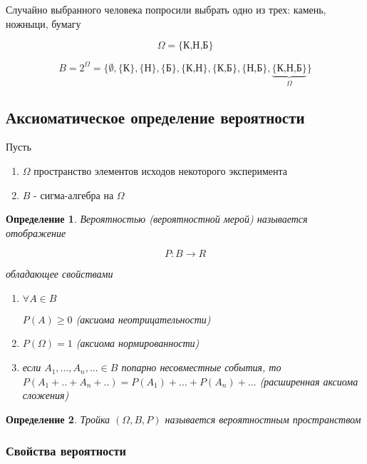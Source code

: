 \documentclass[a4paper, 14pt]{report}
\newtheorem{defenition}{Определение}[section]
\begin{document}
Случайно выбранного человека попросили выбрать одно из трех: камень, ножныци, бумагу

$$
\Omega = \{\text{К,Н,Б}\}
$$

$$
B = 2^\Omega = \{ \emptyset, \{\text{К}\}, \{\text{Н}\}, \{\text{Б}\}, \{\text{К,Н}\}, \{\text{К,Б}\}, \{\text{Н,Б}\}, \underbrace{\{\text{К,Н,Б}\}}_\Omega \}
$$

\subsection{Аксиоматическое определение вероятности}

Пусть

\begin{enumerate}
    \item $\Omega$ пространство элементов исходов некоторого эксперимента
    \item $B$ - сигма-алгебра на $\Omega$
\end{enumerate}

\begin{defenition}
    Вероятностью (вероятностной мерой) называется отображение

    $$
    P: B \to R
    $$

    обладающее свойствами

    \begin{enumerate}
        \item $\forall A \in B$
        
        $ P(A) \geq 0$ (аксиома неотрицательности)
        \item $P(\Omega) = 1$ (аксиома нормированности)
        \item если $A_1, ..., A_n, ... \in B$ попарно несовместные события, то $P(A_1 + .. + A_n + ..) = P(A_1) + ... + P(A_n) + ...$ (расширенная аксиома сложения)
    \end{enumerate}
\end{defenition}

\begin{defenition}
    Тройка $(\Omega, B, P)$ называется вероятностным пространством
\end{defenition}

\subsubsection{Свойства вероятности}
\end{document}
